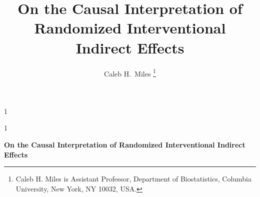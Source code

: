 \documentclass[12pt]{article}
\newcommand{\blind}{1}
\begin{document}
%

\def\spacingset#1{\renewcommand{\baselinestretch}%
{#1}\small\normalsize} \spacingset{1}



\blind { \title{On the Causal Interpretation of Randomized Interventional Indirect Effects} \author{Caleb  H.~Miles \thanks{Caleb
      H.  Miles is Assistant  Professor, Department of Biostatistics, Columbia
      University, New  York, NY 10032,  USA.}\hspace{.2cm}} %
  \date{}
    \maketitle
} \fi

\blind
{
  \bigskip
  \bigskip
  \bigskip
  \begin{center}
    {\LARGE\bf On the Causal Interpretation of Randomized Interventional Indirect Effects}
\end{center}
  \medskip
} \fi

\bigskip
\end{document}
